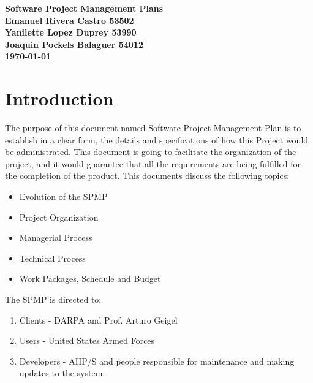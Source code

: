 \documentclass[12pt]{article}
\begin{document}
\begin{titlepage}
 \centering
    \vspace*{15\baselineskip}
    \large
    \bfseries
    Software Project Management Plans  \\[3\baselineskip]
    \normalfont
     \vfill
    Emanuel Rivera Castro 53502 \\
    Yanilette Lopez Duprey 53990\\
    Joaquin Pockels Balaguer 54012\\[2\baselineskip]

    \textbf{\today} \\[2\baselineskip]
\end{titlepage}

\tableofcontents
\pagebreak
\listoftables
\pagebreak
\listoffigures
\clearpage{}

\section{Introduction}
 The purpose of this document named Software Project Management Plan is to establish in a clear form, the details and specifications of how this Project would be administrated. This document is going to facilitate the organization of the project, and it would guarantee that all the requirements are being fulfilled for the completion of the product.  This documents discuss the following topics:
\begin{itemize}
  \item Evolution of the SPMP
  \item Project Organization
  \item Managerial Process
  \item Technical Process
  \item Work Packages, Schedule and Budget
\end{itemize}
The SPMP is directed to:
\begin{enumerate}
  \item Clients - DARPA and Prof. Arturo Geigel
  \item Users - United States Armed Forces
  \item Developers - AIIP/S and people responsible for maintenance and making updates to the system.
\end{enumerate}
\end{document}
